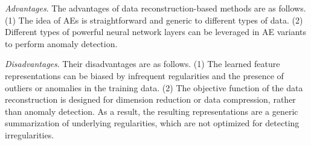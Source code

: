 
\textit{Advantages}. The advantages of data reconstruction-based methods are as follows. (1) The idea of AEs is straightforward and generic to different types of data. (2) Different types of powerful neural network layers can be leveraged in AE variants to perform anomaly detection.

\textit{Disadvantages}. Their disadvantages are as follows. (1) The learned feature representations can be biased by infrequent regularities and the presence of outliers or anomalies in the training data. (2) The objective function of the data reconstruction is designed for dimension reduction or data compression, rather than anomaly detection. As a result, the resulting representations are a generic summarization of underlying regularities, which are not optimized for detecting irregularities.


